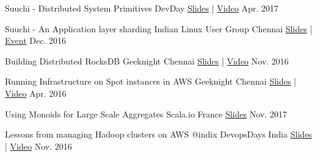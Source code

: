 



\begin{cvhonors}

  \cvhonor
    {Suuchi - Distributed System Primitives} %
    {DevDay} %
    {\href{https://speakerdeck.com/ashwanthkumar/suuchi-distributed-system-primitives}{Slides} | \href{https://www.youtube.com/watch?v=0pW6tAM8rIQ}{Video}} %
    {Apr. 2017} %

  \cvhonor
    {Suuchi - An Application layer sharding} %
    {Indian Linux User Group Chennai} %
    {\href{https://speakerdeck.com/ashwanthkumar/suuchi-application-layer-sharding}{Slides} | \href{https://www.meetup.com/ILUG-C/events/233660958/}{Event}} %
    {Dec. 2016} %

  \cvhonor
    {Building Distributed RocksDB} %
    {Geeknight Chennai} %
    {\href{http://bit.ly/distributed-rocksdb}{Slides} | \href{https://www.youtube.com/watch?v=PSCa9_Avne0}{Video}} %
    {Nov. 2016} %

  \cvhonor
    {Running Infrastructure on Spot instances in AWS} %
    {Geeknight Chennai} %
    {\href{http://j.mp/to-matsya-geeknight}{Slides} | \href{https://www.youtube.com/watch?v=qeBV9JRoTOA}{Video}} %
    {Apr. 2016} %

\end{cvhonors}


\begin{cvhonors}

  \cvhonor
    {Using Monoids for Large Scale Aggregates} %
    {Scala.io France} %
    {\href{https://speakerdeck.com/ashwanthkumar/using-monoids-for-large-scale-aggregates}{Slides}} %
    {Nov. 2017} %

  \cvhonor
    {Lessons from managing Hadoop clusters on AWS @indix} %
    {DevopsDays India} %
    {\href{http://bit.ly/autoscaling-on-aws}{Slides} | \href{https://www.youtube.com/watch?v=eBbgylpRufQ}{Video}} %
    {Nov. 2016} %

\end{cvhonors}

